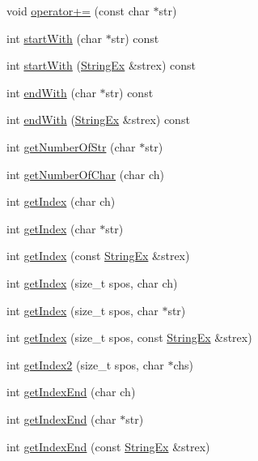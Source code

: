 \begin{CompactItemize}
\item 
void \hyperlink{classStringEx_0ca4d6a67738b3e442789ab2047742a1}{operator+=} (const char $\ast$str)
\item 
int \hyperlink{classStringEx_2f853993f378542f2ff7c15ad9c33c83}{startWith} (char $\ast$str) const 
\item 
int \hyperlink{classStringEx_06ae2efd90272ae17cfb1280ebcc4a87}{startWith} (\hyperlink{classStringEx}{StringEx} \&strex) const 
\item 
int \hyperlink{classStringEx_e0a38173d0b2b402a9cda6cbc362576f}{endWith} (char $\ast$str) const 
\item 
int \hyperlink{classStringEx_07349dc3b2f8579fc030d568e92799e3}{endWith} (\hyperlink{classStringEx}{StringEx} \&strex) const 
\item 
int \hyperlink{classStringEx_a8a5eaa3a07cd0878989763399ea63c8}{getNumberOfStr} (char $\ast$str)
\item 
int \hyperlink{classStringEx_e8543abc9cedc0bd34ff926a68b76058}{getNumberOfChar} (char ch)
\item 
int \hyperlink{classStringEx_a948cbadc89b04c5a794efa85409b6c8}{getIndex} (char ch)
\item 
int \hyperlink{classStringEx_b1238754fc86c1cb1103202bebb1d62b}{getIndex} (char $\ast$str)
\item 
int \hyperlink{classStringEx_706fdc80a0b878a9e273b22db649498e}{getIndex} (const \hyperlink{classStringEx}{StringEx} \&strex)
\item 
int \hyperlink{classStringEx_36da8bd98e3f9c56570d1e5827c26ac4}{getIndex} (size\_\-t spos, char ch)
\item 
int \hyperlink{classStringEx_dce56d45993cbc35db4da5c7b3826886}{getIndex} (size\_\-t spos, char $\ast$str)
\item 
int \hyperlink{classStringEx_725cda468783d70187fea1829a77ae33}{getIndex} (size\_\-t spos, const \hyperlink{classStringEx}{StringEx} \&strex)
\item 
int \hyperlink{classStringEx_85a03ab5f3b7c39a8895fe2c0abfd794}{getIndex2} (size\_\-t spos, char $\ast$chs)
\item 
int \hyperlink{classStringEx_35c910beac3d5410ca6d1b2d80ddb753}{getIndexEnd} (char ch)
\item 
int \hyperlink{classStringEx_413a4c5dd9733f92399d5b75eabfbf19}{getIndexEnd} (char $\ast$str)
\item 
int \hyperlink{classStringEx_10fce95cff1c083a94a8f705daab3e3d}{getIndexEnd} (const \hyperlink{classStringEx}{StringEx} \&strex)
\item 

\end{CompactItemize}
